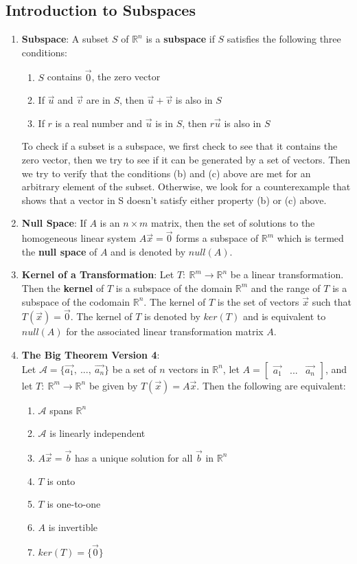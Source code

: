 \documentclass[10pt]{article}
\begin{document}
\subsection{Introduction to Subspaces}
\begin{enumerate}
\item \textbf{Subspace}: A subset $S$ of $\mathbb{R}^n$ is a \textbf{subspace} if $S$ satisfies the following three conditions:
\begin{enumerate}
\item $S$ contains $\vec{0}$, the zero vector
\item If $\vec{u}$ and $\vec{v}$ are in $S$, then $\vec{u} + \vec{v}$ is also in $S$
\item If $r$ is a real number and $\vec{u}$ is in $S$, then $r\vec{u}$ is also in $S$
\end{enumerate}
To check if a subset is a subspace, we first check to see that it contains the zero vector, then we try to see if it can be generated by a set of vectors. Then we try to verify that the conditions (b) and (c) above are met for an arbitrary element of the subset. Otherwise, we look for a counterexample that shows that a vector in S doesn't satisfy either property (b) or (c) above. 
\item \textbf{Null Space}: If $A$ is an $n \times m$ matrix, then the set of solutions to the homogeneous linear system $A\vec{x} = \vec{0}$ forms a subspace of $\mathbb{R}^m$ which is termed the \textbf{null space} of $A$ and is denoted by $null(A)$.
\item \textbf{Kernel of a Transformation}: Let $T:\ \mathbb{R}^m \rightarrow \mathbb{R}^n$ be a linear transformation. Then the \textbf{kernel} of $T$ is a subspace of the domain $\mathbb{R}^m$ and the range of $T$ is a subspace of the codomain $\mathbb{R}^n$. The kernel of $T$ is the set of vectors $\vec{x}$ such that $T(\vec{x}) = \vec{0}$. The kernel of $T$ is denoted by $ker(T)$ and is equivalent to $null(A)$ for the associated linear transformation matrix $A$. 
\item \textbf{The Big Theorem Version 4}: \\
Let $\mathcal{A} = \lbrace \vec{a_1},\ ...,\ \vec{a_n} \rbrace$ be a set of $n$ vectors in $\mathbb{R}^n$, let $A = \begin{bmatrix}
\vec{a_1} & ... & \vec{a_n}
\end{bmatrix}$, and let $T:\ \mathbb{R}^m \rightarrow \mathbb{R}^n$ be given by $T(\vec{x}) = A\vec{x}$. Then the following are equivalent:
\begin{enumerate}
\item $\mathcal{A}$ spans $\mathbb{R}^n$
\item $\mathcal{A}$ is linearly independent
\item $A\vec{x} = \vec{b}$ has a unique solution for all $\vec{b}$ in $\mathbb{R}^n$
\item $T$ is onto
\item $T$ is one-to-one
\item $A$ is invertible
\item $ker(T) = \lbrace \vec{0} \rbrace$
\end{enumerate}
\end{enumerate}
\end{document}

